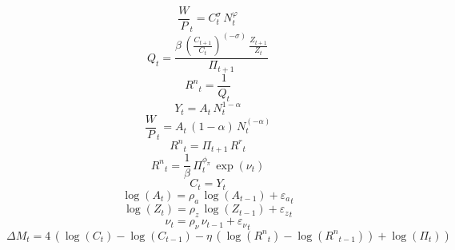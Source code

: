 \begin{dmath}
{{\frac{W}{P}}}_{t}={{C}}_{t}^{{{\sigma}}}\, {{N}}_{t}^{{{\varphi}}}
\end{dmath}
\begin{dmath}
{{Q}}_{t}=\frac{{{\beta}}\, \left(\frac{{{C}}_{t+1}}{{{C}}_{t}}\right)^{\left(-{{\sigma}}\right)}\, \frac{{{Z}}_{t+1}}{{{Z}}_{t}}}{{{\Pi}}_{t+1}}
\end{dmath}
\begin{dmath}
{{R^n}}_{t}=\frac{1}{{{Q}}_{t}}
\end{dmath}
\begin{dmath}
{{Y}}_{t}={{A}}_{t}\, {{N}}_{t}^{1-{{\alpha}}}
\end{dmath}
\begin{dmath}
{{\frac{W}{P}}}_{t}={{A}}_{t}\, \left(1-{{\alpha}}\right)\, {{N}}_{t}^{\left(-{{\alpha}}\right)}
\end{dmath}
\begin{dmath}
{{R^n}}_{t}={{\Pi}}_{t+1}\, {{R^{r}}}_{t}
\end{dmath}
\begin{dmath}
{{R^n}}_{t}=\frac{1}{{{\beta}}}\, {{\Pi}}_{t}^{{{\phi_{\pi}}}}\, \exp\left({{\nu}}_{t}\right)
\end{dmath}
\begin{dmath}
{{C}}_{t}={{Y}}_{t}
\end{dmath}
\begin{dmath}
\log\left({{A}}_{t}\right)={{\rho_a}}\, \log\left({{A}}_{t-1}\right)+{{\varepsilon_a}}_{t}
\end{dmath}
\begin{dmath}
\log\left({{Z}}_{t}\right)={{\rho_z}}\, \log\left({{Z}}_{t-1}\right)+{{\varepsilon_z}}_{t}
\end{dmath}
\begin{dmath}
{{\nu}}_{t}={{\rho_{\nu}}}\, {{\nu}}_{t-1}+{{\varepsilon_\nu}}_{t}
\end{dmath}
\begin{dmath}
{{\Delta M}}_{t}=4\, \left(\log\left({{C}}_{t}\right)-\log\left({{C}}_{t-1}\right)-{{\eta}}\, \left(\log\left({{R^n}}_{t}\right)-\log\left({{R^n}}_{t-1}\right)\right)+\log\left({{\Pi}}_{t}\right)\right)
\end{dmath}
